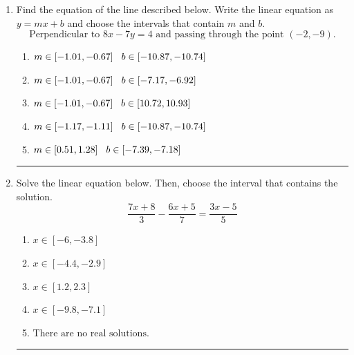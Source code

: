 \documentclass[14pt]{extbook}
\newcommand{\litem}[1]{\item#1\hspace*{-1cm}\rule{\textwidth}{0.4pt}}
\begin{document}
\begin{enumerate}
{\begin{enumerate}[label=\Alph*.]
\end{enumerate} }
\litem{
Find the equation of the line described below. Write the linear equation as $ y=mx+b $ and choose the intervals that contain $m$ and $b$.\[ \text{Perpendicular to } 8 x - 7 y = 4 \text{ and passing through the point } (-2, -9). \]\begin{enumerate}[label=\Alph*.]
\item \( m \in [-1.01, -0.67] \hspace*{3mm} b \in [-10.87, -10.74] \)
\item \( m \in [-1.01, -0.67] \hspace*{3mm} b \in [-7.17, -6.92] \)
\item \( m \in [-1.01, -0.67] \hspace*{3mm} b \in [10.72, 10.93] \)
\item \( m \in [-1.17, -1.11] \hspace*{3mm} b \in [-10.87, -10.74] \)
\item \( m \in [0.51, 1.28] \hspace*{3mm} b \in [-7.39, -7.18] \)

\end{enumerate} }
\litem{
Solve the linear equation below. Then, choose the interval that contains the solution.\[ \frac{7x + 8}{3} - \frac{6x + 5}{7} = \frac{3x -5}{5} \]\begin{enumerate}[label=\Alph*.]
\item \( x \in [-6, -3.8] \)
\item \( x \in [-4.4, -2.9] \)
\item \( x \in [1.2, 2.3] \)
\item \( x \in [-9.8, -7.1] \)
\item \( \text{There are no real solutions.} \)

\end{enumerate} }
\end{enumerate}
\end{document}
